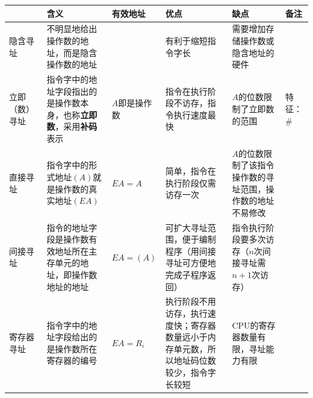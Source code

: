 \documentclass[./computer-organization-and-architecture.tex]{subfiles}
\begin{document}
    \begin{table}[htbp]
        \centering
        \renewcommand{\arraystretch}{1.5}   %
        \setlength{\tabcolsep}{2pt}         %
        \small
        \begin{tabular}{|
                >{\centering\arraybackslash}m{}|
                >{\centering\arraybackslash}m{}|
                >{\centering\arraybackslash}m{}|
                >{\centering\arraybackslash}m{}|
                >{\centering\arraybackslash}m{}|
                >{\centering\arraybackslash}m{}|}
            \hline
            & \textbf{含义}                                                                     & \textbf{有效地址 }  & \textbf{优点}                                                                            & \textbf{缺点}                     & \textbf{备注}                                                                              \\
            \hline
            隐含寻址    & 不明显地给出操作数的地址，而是隐含操作数的地址                                                         &                 & 有利于缩短指令字长                                                                              & 需要增加存储操作数或隐含地址的硬件               &                                                                                          \\
            \hline
            立即（数）寻址 & 指令字中的地址字段指出的是操作数本身，也称\textbf{立即数}，采用\textbf{补码}表示                               & $A$即是操作数        & 指令在执行阶段不访存，指令执行速度最快 & $A$的位数限制了立即数的范围 & 特征：$\#$ \\
            \hline
            直接寻址    & 指令字中的形式地址$(A)$就是操作数的真实地址$(EA)$                                                  & $EA = A$        & 简单，指令在执行阶段仅需访存一次                                                                       & $A$的位数限制了该指令操作数的寻址范围，操作数的地址不易修改 & \\
            \hline
            间接寻址    & 指令的地址字段是操作数有效地址所在主存单元的地址，即操作数地址的地址                                              & $EA = (A)$      & 可扩大寻址范围，便于编制程序（用间接寻址可方便地完成子程序返回） & 指令执行阶段要多次访存（$n$次间接寻址需$n+1$次访存）& \\
            \hline
            寄存器寻址   & 指令字中的地址字段给出的是操作数所在寄存器的编号                                                        & $EA = R_i$      & 执行阶段不用访存，执行速度快；寄存器数量远小于内存单元数，所以地址码位数较少，指令字长较短 & CPU的寄存器数量有限，寻址能力有限 & \\

\end{tabular}
\end{table}
\end{document}
